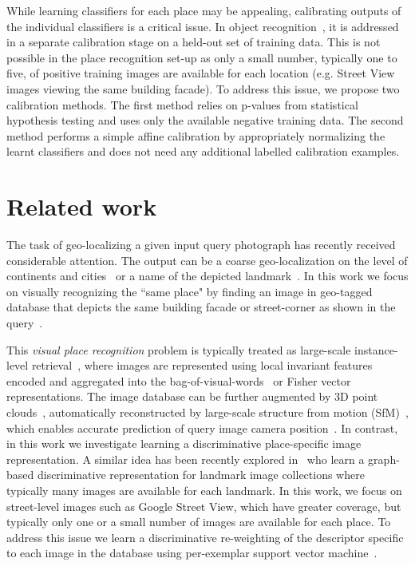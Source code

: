   While learning classifiers for each place may be appealing, calibrating outputs of the individual classifiers is a critical issue. In object recognition~\cite{Malisiewicz11}, it is addressed in a separate calibration stage on a held-out set of training data.
  This is not possible in the place recognition set-up as only a small number, typically one to five, of positive training images are available for each location (e.g. Street View images viewing the same building facade). To address this issue, we propose two calibration methods. 
  The first method relies on p-values from statistical hypothesis testing and uses only the available negative training data. The second method performs a simple affine calibration by appropriately normalizing the learnt classifiers and does not need any additional labelled calibration examples.   



\section{Related work} 
\label{sec:related}


  {
     The task of geo-localizing a given input query photograph has recently received considerable attention. The output can be a coarse geo-localization on the level of continents and cities~\cite{Doersch12,Hays2008,Kalogerakis09} or a name of the depicted landmark~\cite{Li09}.  In this work we focus on visually recognizing the ``same place" by finding an image in geo-tagged database that depicts the same building facade or street-corner as shown in the query~\cite{Chen11,Cummins09,Knopp2010,Schindler07,Torii2013,Zamir10}.
  }

  This {\em visual place recognition} problem is typically treated as large-scale instance-level retrieval~\cite{Cummins09,Chen11,Knopp2010,Schindler07,Torii2013,Zamir10}, where images are represented using local invariant features~\cite{Lowe04} encoded and aggregated into the bag-of-visual-words~\cite{Csurka04,Sivic03} or Fisher vector~\cite{Jegou12} representations. The image database can be further augmented by 3D point clouds~\cite{Klinger13}, automatically reconstructed by large-scale structure from motion (SfM)~\cite{Agarwal-ICCV-2009,Klinger13}, which enables accurate prediction of query image camera position~\cite{Li12,Sattler12}.
  In contrast, in this work we investigate learning a discriminative place-specific image representation. A similar idea has been recently explored in~\cite{Cao13} who learn a graph-based discriminative representation for landmark image collections where typically many images are available for each landmark.
  In this work, we focus on street-level images such as Google Street View, which have greater coverage, but typically only one or a small number of images are  available for each place.  To address this issue we learn a discriminative re-weighting of the descriptor specific to each image in the database using per-exemplar support vector machine~\cite{Malisiewicz11}.
    

